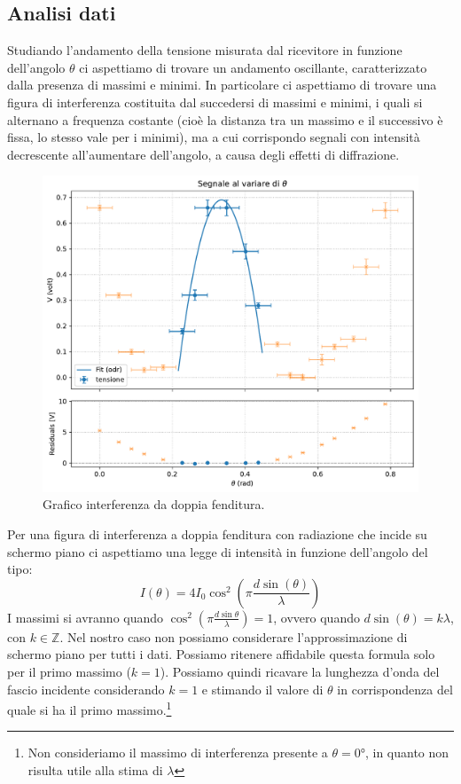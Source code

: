 \documentclass[a4paper]{article}
\begin{document}
\subsection{Analisi dati}
Studiando l'andamento della tensione misurata dal ricevitore in funzione dell'angolo $\theta$ ci aspettiamo di trovare un andamento oscillante, caratterizzato dalla presenza di massimi e minimi. In particolare ci aspettiamo di trovare una figura di interferenza costituita dal succedersi di massimi e minimi, i quali si alternano a frequenza costante (cioè la distanza tra un massimo e il successivo è fissa, lo stesso vale per i minimi), ma a cui corrispondo segnali con intensità decrescente all'aumentare dell'angolo, a causa degli effetti di diffrazione.
\begin{figure}[H]
    \centering
    \includegraphics[width=0.8\linewidth]{grafici/max_doppiafenditura.pdf}
    \caption{Grafico interferenza da doppia fenditura.}
    \label{fig:grafico_doppia_fenditura}
\end{figure}
Per una figura di interferenza a doppia fenditura con radiazione che incide su schermo piano ci aspettiamo una legge di intensità in funzione dell'angolo del tipo: 
\begin{equation}
    I(\theta)=4I_0\cos^2\left(\pi\frac{d \sin(\theta)}{\lambda}\right)
    \label{eq:doppia_fenditura_intensita}
\end{equation}
I massimi si avranno quando $\cos^2\left(\pi\frac{d\sin\theta}{\lambda}\right)=1$, ovvero quando $d\sin(\theta)=k\lambda$, con $k \in \mathbb{Z}$. Nel nostro caso non possiamo considerare l'approssimazione di schermo piano per tutti i dati. Possiamo ritenere affidabile questa formula solo per il primo massimo ($k=1$). Possiamo quindi ricavare la lunghezza d'onda del fascio incidente considerando $k=1$ e stimando il valore di $\theta$ in corrispondenza del quale si ha il primo massimo.\footnote{Non consideriamo il massimo di interferenza presente a $\theta=\ang{0}$, in quanto non risulta utile alla stima di $\lambda$}
\end{document}
